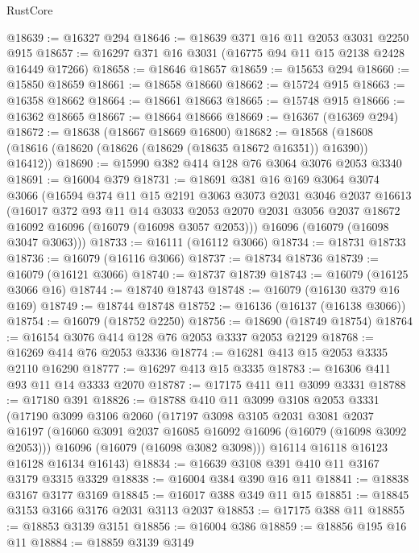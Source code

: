 \begin{lexlean}{RustCore}
\begin{coremodule}
@18639 := @16327 @294
@18646 := @18639 @371 @16 @11 @2053 @3031 @2250 @915
@18657 := @16297 @371 @16 @3031 (@16775 @94 @11 @15 @2138 @2428 @16449 @17266)
@18658 := @18646 @18657
@18659 := @15653 @294
@18660 := @15850 @18659
@18661 := @18658 @18660
@18662 := @15724 @915
@18663 := @16358 @18662
@18664 := @18661 @18663
@18665 := @15748 @915
@18666 := @16362 @18665
@18667 := @18664 @18666
@18669 := @16367 (@16369 @294)
@18672 := @18638 (@18667 @18669 @16800)
@18682 := @18568 (@18608 (@18616 (@18620 (@18626 (@18629 (@18635 @18672 @16351)) @16390)) @16412))
@18690 := @15990 @382 @414 @128 @76 @3064 @3076 @2053 @3340
@18691 := @16004 @379
@18731 := @18691
    @381
    @16
    @169
    @3064
    @3074
    @3066
    (@16594
      @374
      @11
      @15
      @2191
      @3063
      @3073
      @2031
      @3046
      @2037
      @16613
      (@16017
        @372
        @93
        @11
        @14
        @3033
        @2053
        @2070
        @2031
        @3056
        @2037
        @18672
        @16092
        @16096
        (@16079 (@16098 @3057 @2053)))
      @16096
      (@16079 (@16098 @3047 @3063)))
@18733 := @16111 (@16112 @3066)
@18734 := @18731 @18733
@18736 := @16079 (@16116 @3066)
@18737 := @18734 @18736
@18739 := @16079 (@16121 @3066)
@18740 := @18737 @18739
@18743 := @16079 (@16125 @3066 @16)
@18744 := @18740 @18743
@18748 := @16079 (@16130 @379 @16 @169)
@18749 := @18744 @18748
@18752 := @16136 (@16137 (@16138 @3066))
@18754 := @16079 (@18752 @2250)
@18756 := @18690 (@18749 @18754)
@18764 := @16154 @3076 @414 @128 @76 @2053 @3337 @2053 @2129
@18768 := @16269 @414 @76 @2053 @3336
@18774 := @16281 @413 @15 @2053 @3335 @2110 @16290
@18777 := @16297 @413 @15 @3335
@18783 := @16306 @411 @93 @11 @14 @3333 @2070
@18787 := @17175 @411 @11 @3099 @3331
@18788 := @17180 @391
@18826 := @18788
    @410
    @11
    @3099
    @3108
    @2053
    @3331
    (@17190
      @3099
      @3106
      @2060
      (@17197
        @3098
        @3105
        @2031
        @3081
        @2037
        @16197
        (@16060 @3091 @2037 @16085 @16092 @16096 (@16079 (@16098 @3092 @2053)))
        @16096
        (@16079 (@16098 @3082 @3098)))
      @16114
      @16118
      @16123
      @16128
      @16134
      @16143)
@18834 := @16639 @3108 @391 @410 @11 @3167 @3179 @3315 @3329
@18838 := @16004 @384 @390 @16 @11
@18841 := @18838 @3167 @3177 @3169
@18845 := @16017 @388 @349 @11 @15
@18851 := @18845 @3153 @3166 @3176 @2031 @3113 @2037
@18853 := @17175 @388 @11
@18855 := @18853 @3139 @3151
@18856 := @16004 @386
@18859 := @18856 @195 @16 @11
@18884 := @18859
    @3139
    @3149

\end{coremodule}
\end{lexlean}
